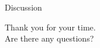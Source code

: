 \begin{frame}{Discussion}

\centering \LARGE Thank you for your time. \\ Are there any questions?

\end{frame}